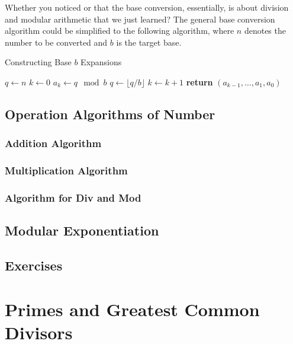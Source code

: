 Whether you noticed or that the base conversion, essentially, is about division and modular arithmetic
that we just learned? The general base conversion algorithm could be simplified to the following algorithm,
where $n$ denotes the number to be converted and $b$ is the target base.
\begin{algorithm}
    \caption{Constructing Base \( b \) Expansions}
    \begin{algorithmic}[1]
    \State $q \gets n$
    \State $k \gets 0$
    \State $a_k \gets q \mod b$
    \State $q \gets \lfloor q / b \rfloor$
    \State $k \gets k + 1$
    \EndWhile
    \State \textbf{return} $(a_{k-1}, \ldots, a_1, a_0)$ 
    \EndProcedure
    \end{algorithmic}
    \end{algorithm}
    \subsection{Operation Algorithms of Number}
        
    \subsubsection*{Addition Algorithm}

    \subsubsection*{Multiplication Algorithm}

    \subsubsection*{Algorithm for Div and Mod}

    \subsection{Modular Exponentiation}

    \subsection{Exercises}


    \section{Primes and Greatest Common Divisors}

